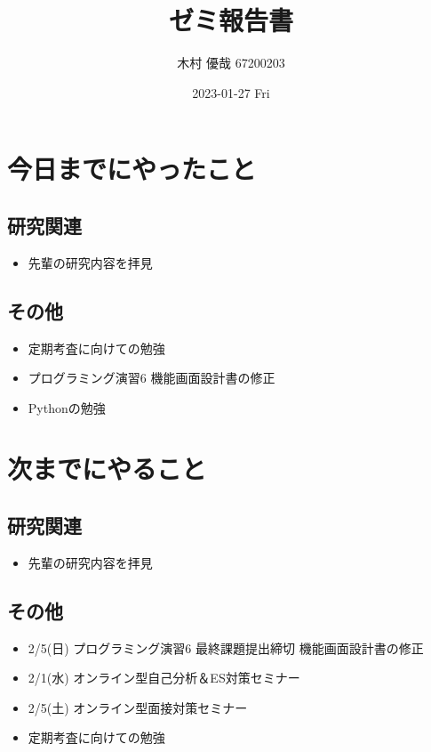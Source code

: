 \documentclass[uplatex, onecolumn, 10pt]{jsarticle}
\begin{document}
\title{\vspace{-40mm}\bf{\LARGE{ゼミ報告書}}}
\author{\vspace{-40mm}木村 優哉 67200203}
\date{2023-01-27 Fri}
\maketitle


\section{今日までにやったこと}

\subsection*{研究関連}
\begin{itemize}
	\item 先輩の研究内容を拝見
\end{itemize}

\subsection*{その他}
\begin{itemize}
	\item 定期考査に向けての勉強
	\item プログラミング演習6 機能画面設計書の修正
	\item Pythonの勉強
\end{itemize}


\section{次までにやること}

\subsection*{研究関連}
\begin{itemize}
	\item 先輩の研究内容を拝見
\end{itemize}

\subsection*{その他}
\begin{itemize}
	\item 2/5(日) プログラミング演習6 最終課題提出締切 機能画面設計書の修正
	\item 2/1(水) オンライン型自己分析＆ES対策セミナー
	\item 2/5(土) オンライン型面接対策セミナー
	\item 定期考査に向けての勉強
\end{itemize}
\end{document}
